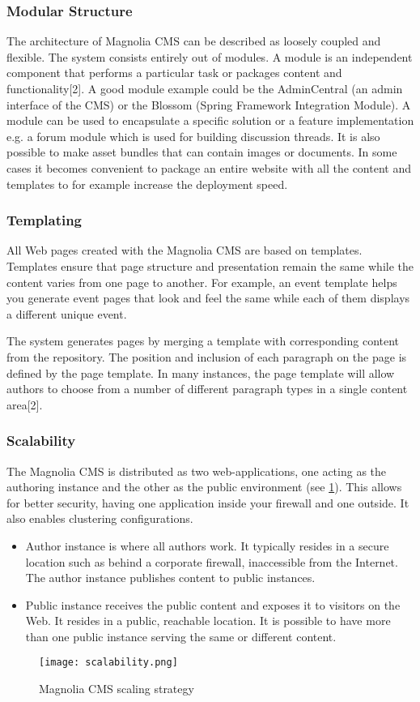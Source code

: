 \subsubsection{Modular Structure}
The architecture of Magnolia CMS can be described as loosely coupled and
flexible. The system consists entirely out of modules.  A module is an
independent component that performs a particular task or packages content and
functionality[2].
A good module example could be the AdminCentral (an admin interface of the CMS)
or the Blossom (Spring Framework Integration Module). A module can be used to
encapsulate a specific solution or a feature implementation e.g. a forum module
which is used for building discussion threads. It is also possible to make asset
bundles that can contain images or documents.
In some cases it becomes convenient to package an entire website with all the
content and templates to for example increase the deployment speed.

\subsubsection{Templating}
All Web pages created with the Magnolia CMS are based on templates. Templates
ensure that page structure and presentation remain the same while the content
varies from one page to another. For example, an event template helps you
generate event pages that look and feel the same while each of them displays a
different unique event.

The system generates pages by merging a template with corresponding content from
the repository. The position and inclusion of each paragraph on the page is
defined by the page template. In many instances, the page template will allow
authors to choose from a number of different paragraph types in a single content
area[2].

\subsubsection{Scalability}

The Magnolia CMS is distributed as two web-applications, one acting as the
authoring instance and the other as the public environment (see \ref{fig:scalability}). This allows for
better security, having one application inside your firewall and one outside. It
also enables clustering configurations.
\begin{itemize}
	\item Author instance is where all authors work. It typically resides in a
	secure location such as behind a corporate firewall, inaccessible from the
	Internet. The author instance publishes content to public instances.
	\item Public instance receives the public content and exposes it to visitors on
	the Web. It resides in a public, reachable location. It is possible to have more
	than one public instance serving the same or different content.
\end{itemize}
\begin{figure}[H]
	\centering
	\texttt{[image: scalability.png]}
	\caption{Magnolia CMS scaling strategy}
	\label{fig:scalability}
\end{figure}

